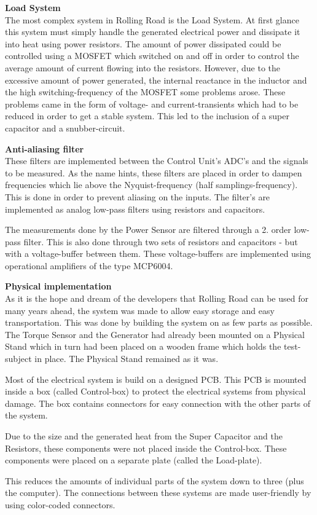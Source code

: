 \textbf{Load System}\\
The most complex system in Rolling Road is the Load System. At first glance this system must simply handle the generated electrical power and dissipate it into heat using power resistors\cite{PowerResistor}. The amount of power dissipated could be controlled using a MOSFET\cite{IRFP260N} which switched on and off in order to control the average amount of current flowing into the resistors. However, due to the excessive amount of power generated, the internal reactance in the inductor and the high switching-frequency of the MOSFET some problems arose. These problems came in the form of voltage- and current-transients which had to be reduced in order to get a stable system. This led to the inclusion of a super capacitor\cite{SuperCapacitor} and a snubber-circuit\cite{Snubber}.

\textbf{Anti-aliasing filter}\\
These filters are implemented between the Control Unit's ADC's and the signals to be measured. As the name hints, these filters are placed in order to dampen frequencies which lie above the Nyquist-frequency (half samplings-frequency). This is done in order to prevent aliasing on the inputs. The filter's are implemented as analog low-pass filters using resistors and capacitors. 

The measurements done by the Power Sensor are filtered through a 2. order low-pass filter. This is also done through two sets of resistors and capacitors - but with a voltage-buffer between them. These voltage-buffers are implemented using operational amplifiers of the type MCP6004\cite{MCP6004}.

\textbf{Physical implementation}\\
As it is the hope and dream of the developers that Rolling Road can be used for many years ahead, the system was made to allow easy storage and easy transportation. This was done by building the system on as few parts as possible. The Torque Sensor and the Generator had already been mounted on a Physical Stand which in turn had been placed on a wooden frame which holds the test-subject in place. The Physical Stand remained as it was.

Most of the electrical system is build on a designed PCB. This PCB is mounted inside a box (called Control-box) to protect the electrical systems from physical damage. The box contains connectors for easy connection with the other parts of the system.

Due to the size and the generated heat from the Super Capacitor and the Resistors, these components were not placed inside the Control-box. These components were placed on a separate plate (called the Load-plate).

This reduces the amounts of individual parts of the system down to three (plus the computer). The connections between these systems are made user-friendly by using color-coded connectors.